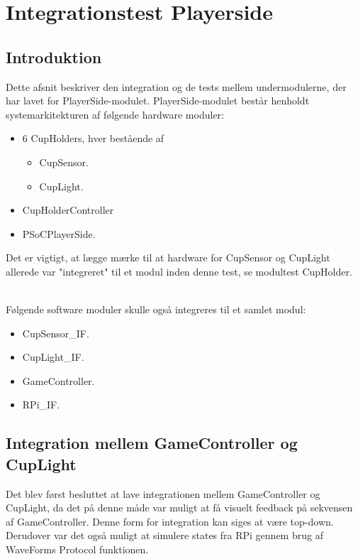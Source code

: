 \documentclass[Integrationstest/Integrationstest_main.tex]{subfiles}
\begin{document}
\section{Integrationstest Playerside}
\subsection{Introduktion}
Dette afsnit beskriver den integration og de tests mellem undermodulerne, der har lavet for PlayerSide-modulet. PlayerSide-modulet består henholdt systemarkitekturen af følgende hardware moduler: 
\begin{itemize}
    \item 6 CupHolders, hver bestående af 
    \begin{itemize}
        \item CupSensor.
        \item CupLight.
    \end{itemize}
    \item CupHolderController
    \item PSoCPlayerSide.
\end{itemize}
Det er vigtigt, at lægge mærke til at hardware for CupSensor og CupLight allerede var "integreret" til et modul inden denne test, se modultest CupHolder. 

\\Følgende software moduler skulle også integreres til et samlet modul:
\begin{itemize}
    \item CupSensor\_IF.
    \item CupLight\_IF.
    \item GameController.
    \item RPi\_IF.
\end{itemize}


\subsection{Integration mellem GameController og CupLight}
Det blev først besluttet at lave integrationen mellem GameController og CupLight, da det på denne måde var muligt at få visuelt feedback på sekvensen af GameController. Denne form for integration kan siges at være top-down.  Derudover var det også muligt at simulere states fra RPi gennem brug af WaveForms Protocol funktionen. 
\end{document}
